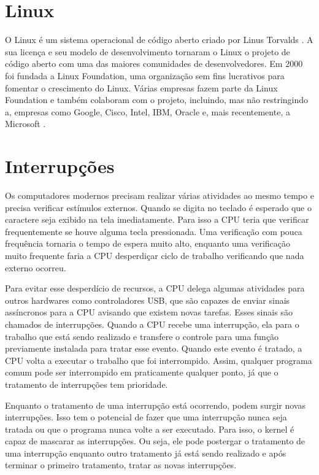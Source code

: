 \section{Linux}

O Linux é um sistema operacional de código aberto criado por Linus Torvalds \cite{Linux}. A sua licença e seu modelo de desenvolvimento tornaram o Linux o projeto de código aberto com uma das maiores comunidades de desenvolvedores. Em 2000 foi fundada a Linux Foundation, uma organização sem fins lucrativos para fomentar o crescimento do Linux. Várias empresas fazem parte da Linux Foundation e também colaboram com o projeto, incluindo, mas não restringindo a, empresas como Google, Cisco, Intel, IBM, Oracle e, mais recentemente, a Microsoft \cite{LinuxFoundation}. 

\section{Interrupções}

Os computadores modernos precisam realizar várias atividades ao mesmo tempo e precisa verificar estímulos externos. Quando se digita no teclado é esperado que o caractere seja exibido na tela imediatamente. Para isso a CPU teria que verificar frequentemente se houve alguma tecla pressionada. Uma verificação com pouca frequência tornaria o tempo de espera muito alto, enquanto uma verificação muito frequente faria a CPU desperdiçar ciclo de trabalho verificando que nada externo ocorreu.

Para evitar esse desperdício de recursos, a CPU delega algumas atividades para outros hardwares como controladores USB, que são capazes de enviar sinais assíncronos para a CPU avisando que existem novas tarefas. Esses sinais são chamados de interrupções. Quando a CPU recebe uma interrupção, ela para o trabalho que está sendo realizado e transfere o controle para uma função previamente instalada para tratar esse evento. Quando este evento é tratado, a CPU volta a executar o trabalho que foi interrompido. Assim, qualquer programa comum pode ser interrompido em praticamente qualquer ponto, já que o tratamento de interrupções tem prioridade.

Enquanto o tratamento de uma interrupção está ocorrendo, podem surgir novas interrupções. Isso tem o potencial de fazer que uma interrupção nunca seja tratada ou que o programa nunca volte a ser executado. Para isso, o kernel é capaz de mascarar as interrupções. Ou seja, ele pode postergar o tratamento de uma interrupção enquanto outro tratamento já está sendo realizado e após terminar o primeiro tratamento, tratar as novas interrupções.

